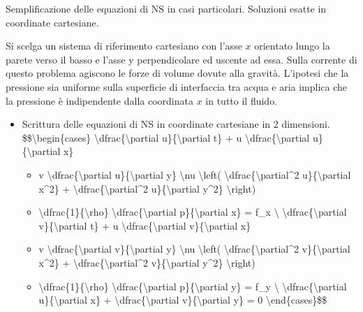 \documentclass[letterpaper,10pt,italian]{jupyterBook}
\begin{document}
\sphinxAtStartPar
Semplificazione delle equazioni di NS in casi particolari. Soluzioni
esatte in coordinate cartesiane.

\sphinxAtStartPar
Si scelga un sistema di riferimento cartesiano con l’asse \(x\) orientato
lungo la parete verso il basso e l’asse y perpendicolare ed uscente ad
essa. Sulla corrente di questo problema agiscono le forze di volume
dovute alla gravità. L’ipotesi che la pressione sia uniforme sulla
superficie di interfaccia tra acqua e aria implica che la pressione è
indipendente dalla coordinata \(x\) in tutto il fluido.
\begin{itemize}
\item {} 
\sphinxAtStartPar
Scrittura delle equazioni di NS in coordinate cartesiane in 2
dimensioni. \$\$\textbackslash{}begin\{cases\}
\textbackslash{}dfrac\{\textbackslash{}partial u\}\{\textbackslash{}partial t\} + u \textbackslash{}dfrac\{\textbackslash{}partial u\}\{\textbackslash{}partial x\}
\begin{itemize}
\item {} 
\sphinxAtStartPar
v \textbackslash{}dfrac\{\textbackslash{}partial u\}\{\textbackslash{}partial y\} \sphinxhyphen{} \textbackslash{}nu \textbackslash{}left(
\textbackslash{}dfrac\{\textbackslash{}partial\textasciicircum{}2 u\}\{\textbackslash{}partial x\textasciicircum{}2\} +
\textbackslash{}dfrac\{\textbackslash{}partial\textasciicircum{}2 u\}\{\textbackslash{}partial y\textasciicircum{}2\} \textbackslash{}right)

\item {} 
\sphinxAtStartPar
\textbackslash{}dfrac\{1\}\{\textbackslash{}rho\} \textbackslash{}dfrac\{\textbackslash{}partial p\}\{\textbackslash{}partial x\} = f\_x \textbackslash{}
\textbackslash{}dfrac\{\textbackslash{}partial v\}\{\textbackslash{}partial t\} + u \textbackslash{}dfrac\{\textbackslash{}partial v\}\{\textbackslash{}partial x\}

\item {} 
\sphinxAtStartPar
v \textbackslash{}dfrac\{\textbackslash{}partial v\}\{\textbackslash{}partial y\} \sphinxhyphen{} \textbackslash{}nu \textbackslash{}left(
\textbackslash{}dfrac\{\textbackslash{}partial\textasciicircum{}2 v\}\{\textbackslash{}partial x\textasciicircum{}2\} +
\textbackslash{}dfrac\{\textbackslash{}partial\textasciicircum{}2 v\}\{\textbackslash{}partial y\textasciicircum{}2\} \textbackslash{}right)

\item {} 
\sphinxAtStartPar
\textbackslash{}dfrac\{1\}\{\textbackslash{}rho\} \textbackslash{}dfrac\{\textbackslash{}partial p\}\{\textbackslash{}partial y\} = f\_y \textbackslash{}
\textbackslash{}dfrac\{\textbackslash{}partial u\}\{\textbackslash{}partial x\} + \textbackslash{}dfrac\{\textbackslash{}partial v\}\{\textbackslash{}partial y\} = 0
\textbackslash{}end\{cases\}\$\$


\end{itemize}
\end{itemize}
\end{document}
